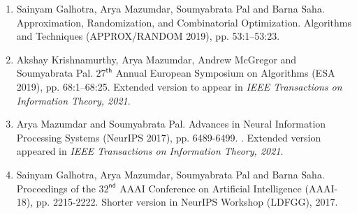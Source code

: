 \documentclass[9pt]{article}
\begin{document}
\begin{enumerate}
\item Sainyam Galhotra, Arya Mazumdar, Soumyabrata Pal and Barna Saha. \href{https://arxiv.org/abs/1804.05013}{ } Approximation, Randomization, and Combinatorial Optimization. Algorithms and Techniques (APPROX/RANDOM 2019), pp. 53:1--53:23. 

\item Akshay Krishnamurthy, Arya Mazumdar, Andrew McGregor and Soumyabrata Pal. \href{https://arxiv.org/pdf/1904.09618.pdf}{ } $27^{\mathsf{th}}$ Annual European Symposium on Algorithms (ESA 2019), pp. 68:1--68:25. Extended version  to appear in \textit{IEEE Transactions on Information Theory, 2021}.

\item Arya Mazumdar and Soumyabrata Pal.  \href{https://arxiv.org/abs/1904.00507}{} Advances in Neural Information Processing Systems (NeurIPS 2017), pp. 6489-6499. \textbf{\color{red}{Selected for Spotlight}}. Extended version appeared in \textit{IEEE Transactions on Information Theory, 2021}.

\item Sainyam Galhotra, Arya Mazumdar, Soumyabrata Pal and Barna Saha. \href{https://arxiv.org/abs/1709.05510}{} Proceedings of the $32^{\mathsf{nd}}$ {AAAI} Conference on Artificial Intelligence (AAAI-18), pp. 2215-2222. Shorter version in NeurIPS Workshop (LDFGG), 2017. 

\end{enumerate}
\end{document}
